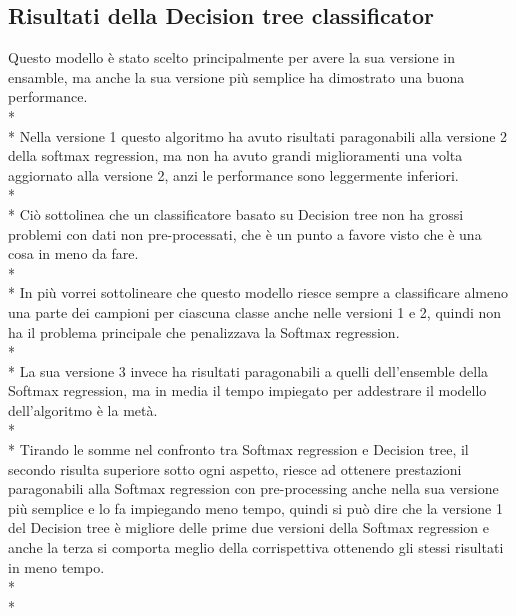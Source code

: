 \subsection{Risultati della Decision tree classificator}\label{ssec:DecisionRes}
\normalsize
Questo modello è stato scelto principalmente per avere la sua versione in ensamble, ma anche la sua versione più semplice ha dimostrato una buona performance.\\*\\*
Nella versione 1 questo algoritmo ha avuto risultati paragonabili alla versione 2 della softmax regression, ma non ha avuto grandi miglioramenti una volta aggiornato alla versione 2, anzi le performance sono leggermente inferiori. \\*\\*
Ciò sottolinea che un classificatore basato su Decision tree non ha grossi problemi con dati non pre-processati, che è un punto a favore visto che è una cosa in meno da fare.\\*\\*
In più vorrei sottolineare che questo modello riesce sempre a classificare almeno una parte dei campioni per ciascuna classe anche nelle versioni 1 e 2, quindi non ha il problema principale che penalizzava la Softmax regression.\\*\\*
La sua versione 3 invece ha risultati paragonabili a quelli dell’ensemble della Softmax regression, ma in media il tempo impiegato per addestrare il modello dell’algoritmo è la metà.\\*\\*
Tirando le somme nel confronto tra Softmax regression e Decision tree, il secondo risulta superiore sotto ogni aspetto, riesce ad ottenere prestazioni paragonabili alla Softmax regression con pre-processing anche nella sua versione più semplice e lo fa impiegando meno tempo, quindi si può dire che la versione 1 del Decision tree è migliore delle prime due versioni della Softmax regression e anche la terza si comporta meglio della corrispettiva ottenendo gli stessi risultati in meno tempo.\\*\\*

